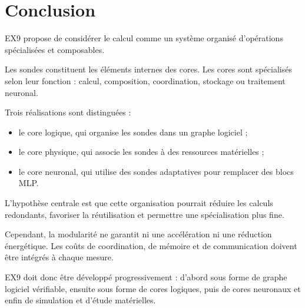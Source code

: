 \documentclass[11pt,a4paper]{article}
\begin{document}
\section{Conclusion}

EX9 propose de considérer le calcul comme un système organisé
d'opérations spécialisées et composables.

Les sondes constituent les éléments internes des cores.
Les cores sont spécialisés selon leur fonction :
calcul, composition, coordination, stockage ou traitement neuronal.

Trois réalisations sont distinguées :
\begin{itemize}
  \item le core logique, qui organise les sondes dans un graphe logiciel ;
  \item le core physique, qui associe les sondes à des ressources matérielles ;
  \item le core neuronal, qui utilise des sondes adaptatives pour remplacer
        des blocs MLP.
\end{itemize}

L'hypothèse centrale est que cette organisation pourrait réduire
les calculs redondants, favoriser la réutilisation et permettre
une spécialisation plus fine.

Cependant, la modularité ne garantit ni une accélération ni une
réduction énergétique. Les coûts de coordination, de mémoire et
de communication doivent être intégrés à chaque mesure.

EX9 doit donc être développé progressivement : d'abord sous forme
de graphe logiciel vérifiable, ensuite sous forme de cores logiques,
puis de cores neuronaux et enfin de simulation et d'étude matérielles.
\end{document}
